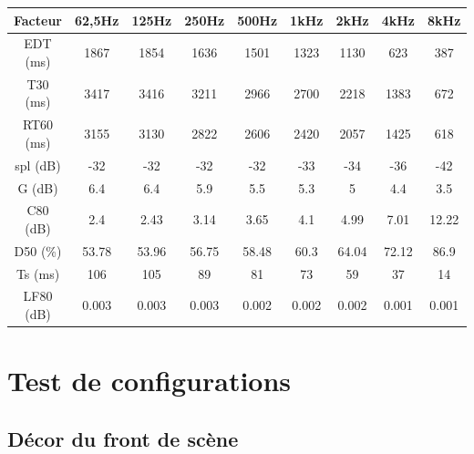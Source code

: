 \begin{figureth}
\begin{subfigureth}{0.61\textwidth}
		\caption{Source-images projetées sur les parois du théâtre jusqu'à -30dB.}
		\label{SI30dB}
	\end{subfigureth}
\caption{Source-images dans le théâtre d'Orange dans sa configuration initiale pour 1 million de rayons.}	
\label{SITheatre30}
\end{figureth}


\begin{tableth}
 \begin{tabular}{| *{9}{c|}} 
 \hline 
 Facteur & 62,5Hz & 125Hz & 250Hz & 500Hz & 1kHz & 2kHz & 4kHz & 8kHz \\ 
 \hline 
 \hline 
\gls{EDT} (ms)& 1867& 1854& 1636& 1501& 1323& 1130& 623& 387 \\ 
 \hline 
\gls{T30} (ms)& 3417& 3416& 3211& 2966& 2700& 2218& 1383& 672 \\ 
 \hline 
\gls{RT60} (ms)& 3155& 3130& 2822& 2606& 2420& 2057& 1425& 618 \\ 
 \hline 
\gls{spl} (dB)& -32& -32& -32& -32& -33& -34& -36& -42 \\ 
 \hline 
\gls{G} (dB)& 6.4& 6.4& 5.9& 5.5& 5.3& 5& 4.4& 3.5 \\ 
 \hline 
\gls{C80} (dB)& 2.4& 2.43& 3.14& 3.65& 4.1& 4.99& 7.01& 12.22 \\ 
 \hline 
\gls{D50} (\%)& 53.78& 53.96& 56.75& 58.48& 60.3& 64.04& 72.12& 86.9 \\ 
 \hline 
\gls{Ts} (ms)& 106& 105& 89& 81& 73& 59& 37& 14 \\ 
 \hline 
\gls{LF80} (dB)& 0.003& 0.003& 0.003& 0.002& 0.002& 0.002& 0.001& 0.001 \\ 
 \hline 
\end{tabular} 
 \caption{Facteurs perceptifs pour une source en [0 ; 5.6 ; 42.8] et un auditeur en [0 ; -16.5 ; 42.8] et 1000000 rayons dans la configuration initiale.}
 \label{tab_fact_init} 
 \end{tableth}



		
\chapter{Test de configurations}
	\minitoc
	\newpage

\section{Décor du front de scène}

